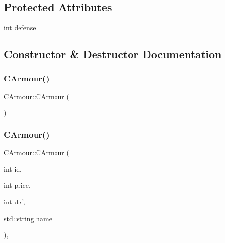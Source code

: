 \subsection*{Protected Attributes}
\begin{DoxyCompactItemize}
\item 
int \mbox{\hyperlink{class_c_armour_ad071169660d837db44ff38e73c92dd10}{defense}}
\end{DoxyCompactItemize}


\subsection{Constructor \& Destructor Documentation}
\mbox{\label{class_c_armour_a4d9522bb2d9b8c4d111a8a8c446d23a1}} 
\subsubsection{\texorpdfstring{C\+Armour()}{CArmour()}\hspace{0.1cm}{\footnotesize\ttfamily [1/2]}}
{\footnotesize\ttfamily C\+Armour\+::\+C\+Armour (\begin{DoxyParamCaption}{ }\end{DoxyParamCaption})\hspace{0.3cm}{\ttfamily [default]}}

\mbox{\label{class_c_armour_a9bc0c6d2b7225cd2b15397006916cd1b}} 
\subsubsection{\texorpdfstring{C\+Armour()}{CArmour()}\hspace{0.1cm}{\footnotesize\ttfamily [2/2]}}
{\footnotesize\ttfamily C\+Armour\+::\+C\+Armour (\begin{DoxyParamCaption}\item[{int}]{id,  }\item[{int}]{price,  }\item[{int}]{def,  }\item[{std\+::string}]{name }\end{DoxyParamCaption})\hspace{0.3cm}{\ttfamily [inline]}, {\ttfamily [explicit]}}



